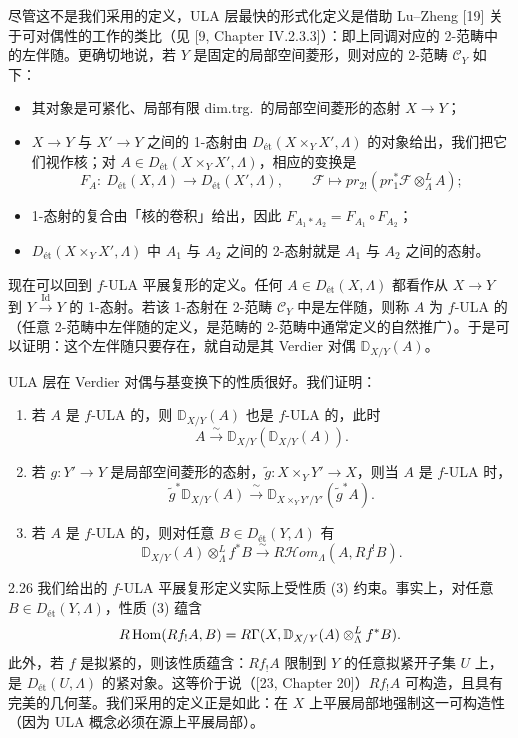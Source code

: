 尽管这不是我们采用的定义，ULA 层最快的形式化定义是借助 Lu--Zheng [19] 关于可对偶性的工作的类比（见 [9, Chapter IV.2.3.3]）：即上同调对应的 2-范畴中的左伴随。更确切地说，若 $Y$ 是固定的局部空间菱形，则对应的 2-范畴 $\mathcal C_Y$ 如下：
\begin{itemize}[leftmargin=1.6em,itemsep=0.2em]
\item 其对象是可紧化、局部有限 dim.trg.\ 的局部空间菱形的态射 $X\to Y$；
\item $X\to Y$ 与 $X'\to Y$ 之间的 1-态射由 $D_{\text{ét}}(X\times_Y X',\Lambda)$ 的对象给出，我们把它们视作核；对 $A\in D_{\text{ét}}(X\times_Y X',\Lambda)$，相应的变换是
\[
F_A:\ D_{\text{ét}}(X,\Lambda)\longrightarrow D_{\text{ét}}(X',\Lambda),\qquad
\mathcal F\longmapsto pr_{2!}(pr_1^*\mathcal F\otimes^L_\Lambda A);
\]
\item 1-态射的复合由「核的卷积」给出，因此 $F_{A_1*A_2}=F_{A_1}\circ F_{A_2}$；
\item $D_{\text{ét}}(X\times_Y X',\Lambda)$ 中 $A_1$ 与 $A_2$ 之间的 2-态射就是 $A_1$ 与 $A_2$ 之间的态射。
\end{itemize}

现在可以回到 $f$-ULA 平展复形的定义。任何 $A\in D_{\text{ét}}(X,\Lambda)$ 都看作从 $X\to Y$ 到 $Y\xrightarrow{\mathrm{Id}}Y$ 的 1-态射。若该 1-态射在 2-范畴 $\mathcal C_Y$ 中是左伴随，则称 $A$ 为 $f$-ULA 的（任意 2-范畴中左伴随的定义，是范畴的 2-范畴中通常定义的自然推广）。于是可以证明：这个左伴随只要存在，就自动是其 Verdier 对偶 $\mathbb D_{X/Y}(A)$。

ULA 层在 Verdier 对偶与基变换下的性质很好。我们证明：
\begin{enumerate}[label=(\arabic*),leftmargin=2.4em,itemsep=0.2em]
\item 若 $A$ 是 $f$-ULA 的，则 $\mathbb D_{X/Y}(A)$ 也是 $f$-ULA 的，此时
\[
A\xrightarrow{\ \sim\ }\mathbb D_{X/Y}(\mathbb D_{X/Y}(A)).
\]
\item 若 $g:Y'\to Y$ 是局部空间菱形的态射，$\tilde g:X\times_Y Y'\to X$，则当 $A$ 是 $f$-ULA 时，
\[
\tilde g^*\mathbb D_{X/Y}(A)\xrightarrow{\ \sim\ }\mathbb D_{X\times_Y Y'/Y'}(\tilde g^*A).
\]
\item 若 $A$ 是 $f$-ULA 的，则对任意 $B\in D_{\text{ét}}(Y,\Lambda)$ 有
\[
\mathbb D_{X/Y}(A)\otimes^L_\Lambda f^*B\xrightarrow{\ \sim\ }R\mathcal Hom_\Lambda(A,Rf^!B).
\]
\end{enumerate}
\begin{rem}{2.26}
我们给出的 $f$-ULA 平展复形定义实际上受性质 (3) 约束。事实上，对任意 $B\in D_{\text{ét}}(Y,\Lambda)$，性质 (3) 蕴含
\[
R\operatorname{Hom}(Rf_!A,B)=R\Gamma(X,\mathbb D_{X/Y}(A)\otimes^L_\Lambda f^*B).
\]
此外，若 $f$ 是拟紧的，则该性质蕴含：$Rf_!A$ 限制到 $Y$ 的任意拟紧开子集 $U$ 上，是 $D_{\text{ét}}(U,\Lambda)$ 的紧对象。这等价于说（[23, Chapter 20]）$Rf_!A$ 可构造，且具有完美的几何茎。我们采用的定义正是如此：在 $X$ 上平展局部地强制这一可构造性（因为 ULA 概念必须在源上平展局部）。\label{rem:a3-2-26}
\end{rem}

